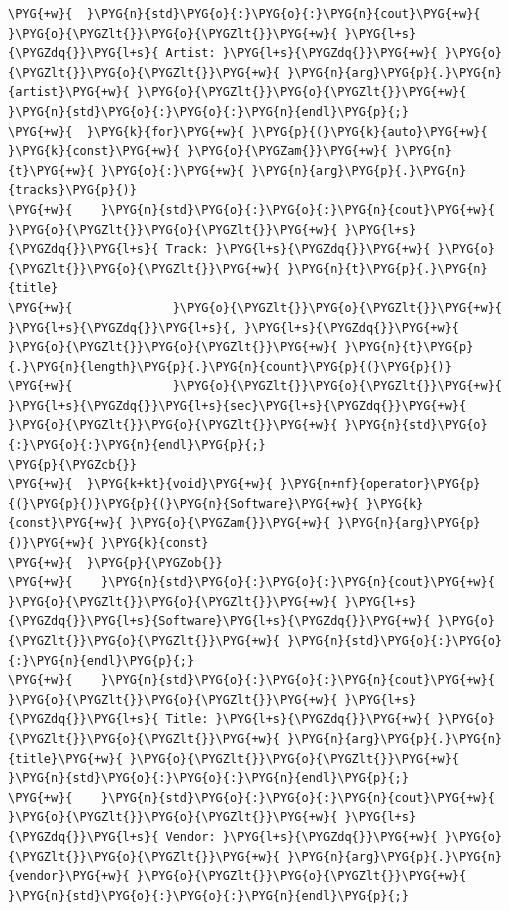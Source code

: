 \begin{itemize}
\begin{codeblockbg}
\begin{Verbatim}[commandchars=\\\{\},breaklines=true,breakanywhere=true,fontsize=\codefont,xleftmargin=17bp]
\PYG{+w}{  }\PYG{n}{std}\PYG{o}{:}\PYG{o}{:}\PYG{n}{cout}\PYG{+w}{ }\PYG{o}{\PYGZlt{}}\PYG{o}{\PYGZlt{}}\PYG{+w}{ }\PYG{l+s}{\PYGZdq{}}\PYG{l+s}{ Artist: }\PYG{l+s}{\PYGZdq{}}\PYG{+w}{ }\PYG{o}{\PYGZlt{}}\PYG{o}{\PYGZlt{}}\PYG{+w}{ }\PYG{n}{arg}\PYG{p}{.}\PYG{n}{artist}\PYG{+w}{ }\PYG{o}{\PYGZlt{}}\PYG{o}{\PYGZlt{}}\PYG{+w}{ }\PYG{n}{std}\PYG{o}{:}\PYG{o}{:}\PYG{n}{endl}\PYG{p}{;}
\PYG{+w}{  }\PYG{k}{for}\PYG{+w}{ }\PYG{p}{(}\PYG{k}{auto}\PYG{+w}{ }\PYG{k}{const}\PYG{+w}{ }\PYG{o}{\PYGZam{}}\PYG{+w}{ }\PYG{n}{t}\PYG{+w}{ }\PYG{o}{:}\PYG{+w}{ }\PYG{n}{arg}\PYG{p}{.}\PYG{n}{tracks}\PYG{p}{)}
\PYG{+w}{    }\PYG{n}{std}\PYG{o}{:}\PYG{o}{:}\PYG{n}{cout}\PYG{+w}{ }\PYG{o}{\PYGZlt{}}\PYG{o}{\PYGZlt{}}\PYG{+w}{ }\PYG{l+s}{\PYGZdq{}}\PYG{l+s}{ Track: }\PYG{l+s}{\PYGZdq{}}\PYG{+w}{ }\PYG{o}{\PYGZlt{}}\PYG{o}{\PYGZlt{}}\PYG{+w}{ }\PYG{n}{t}\PYG{p}{.}\PYG{n}{title}
\PYG{+w}{              }\PYG{o}{\PYGZlt{}}\PYG{o}{\PYGZlt{}}\PYG{+w}{ }\PYG{l+s}{\PYGZdq{}}\PYG{l+s}{, }\PYG{l+s}{\PYGZdq{}}\PYG{+w}{ }\PYG{o}{\PYGZlt{}}\PYG{o}{\PYGZlt{}}\PYG{+w}{ }\PYG{n}{t}\PYG{p}{.}\PYG{n}{length}\PYG{p}{.}\PYG{n}{count}\PYG{p}{(}\PYG{p}{)}
\PYG{+w}{              }\PYG{o}{\PYGZlt{}}\PYG{o}{\PYGZlt{}}\PYG{+w}{ }\PYG{l+s}{\PYGZdq{}}\PYG{l+s}{sec}\PYG{l+s}{\PYGZdq{}}\PYG{+w}{ }\PYG{o}{\PYGZlt{}}\PYG{o}{\PYGZlt{}}\PYG{+w}{ }\PYG{n}{std}\PYG{o}{:}\PYG{o}{:}\PYG{n}{endl}\PYG{p}{;}
\PYG{p}{\PYGZcb{}}
\PYG{+w}{  }\PYG{k+kt}{void}\PYG{+w}{ }\PYG{n+nf}{operator}\PYG{p}{(}\PYG{p}{)}\PYG{p}{(}\PYG{n}{Software}\PYG{+w}{ }\PYG{k}{const}\PYG{+w}{ }\PYG{o}{\PYGZam{}}\PYG{+w}{ }\PYG{n}{arg}\PYG{p}{)}\PYG{+w}{ }\PYG{k}{const}
\PYG{+w}{  }\PYG{p}{\PYGZob{}}
\PYG{+w}{    }\PYG{n}{std}\PYG{o}{:}\PYG{o}{:}\PYG{n}{cout}\PYG{+w}{ }\PYG{o}{\PYGZlt{}}\PYG{o}{\PYGZlt{}}\PYG{+w}{ }\PYG{l+s}{\PYGZdq{}}\PYG{l+s}{Software}\PYG{l+s}{\PYGZdq{}}\PYG{+w}{ }\PYG{o}{\PYGZlt{}}\PYG{o}{\PYGZlt{}}\PYG{+w}{ }\PYG{n}{std}\PYG{o}{:}\PYG{o}{:}\PYG{n}{endl}\PYG{p}{;}
\PYG{+w}{    }\PYG{n}{std}\PYG{o}{:}\PYG{o}{:}\PYG{n}{cout}\PYG{+w}{ }\PYG{o}{\PYGZlt{}}\PYG{o}{\PYGZlt{}}\PYG{+w}{ }\PYG{l+s}{\PYGZdq{}}\PYG{l+s}{ Title: }\PYG{l+s}{\PYGZdq{}}\PYG{+w}{ }\PYG{o}{\PYGZlt{}}\PYG{o}{\PYGZlt{}}\PYG{+w}{ }\PYG{n}{arg}\PYG{p}{.}\PYG{n}{title}\PYG{+w}{ }\PYG{o}{\PYGZlt{}}\PYG{o}{\PYGZlt{}}\PYG{+w}{ }\PYG{n}{std}\PYG{o}{:}\PYG{o}{:}\PYG{n}{endl}\PYG{p}{;}
\PYG{+w}{    }\PYG{n}{std}\PYG{o}{:}\PYG{o}{:}\PYG{n}{cout}\PYG{+w}{ }\PYG{o}{\PYGZlt{}}\PYG{o}{\PYGZlt{}}\PYG{+w}{ }\PYG{l+s}{\PYGZdq{}}\PYG{l+s}{ Vendor: }\PYG{l+s}{\PYGZdq{}}\PYG{+w}{ }\PYG{o}{\PYGZlt{}}\PYG{o}{\PYGZlt{}}\PYG{+w}{ }\PYG{n}{arg}\PYG{p}{.}\PYG{n}{vendor}\PYG{+w}{ }\PYG{o}{\PYGZlt{}}\PYG{o}{\PYGZlt{}}\PYG{+w}{ }\PYG{n}{std}\PYG{o}{:}\PYG{o}{:}\PYG{n}{endl}\PYG{p}{;}

\end{Verbatim}
\end{codeblockbg}
\end{itemize}
